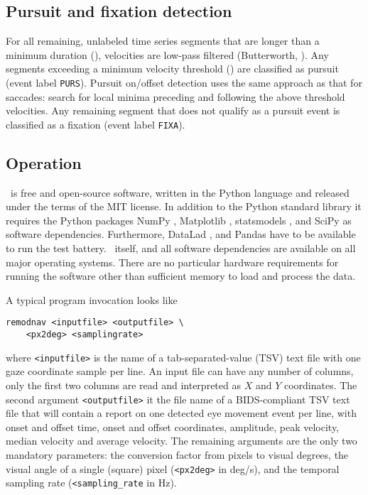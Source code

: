 \subsection*{Pursuit and fixation detection}

For all remaining, unlabeled time series segments that are longer than a
minimum duration (), velocities are low-pass
filtered (Butterworth, ). Any segments
exceeding a minimum velocity threshold () are
classified as pursuit (event label \texttt{PURS}). Pursuit on/offset detection
uses the same approach as that for saccades: search for local minima preceding
and following the above threshold velocities.
%
Any remaining segment that does not qualify as a pursuit event is classified
as a fixation (event label \texttt{FIXA}).


\subsection*{Operation}\label{op}

\remodnav\ is free and open-source software, written in the Python language and
released under the terms of the MIT license. In addition to the Python standard
library it requires the Python packages
%
NumPy \citep{oliphant2006guide},
Matplotlib \citep{hunter2007matplotlib},
statsmodels \citep{seabold2010statsmodels},
and SciPy \citep{JOP+2001} as software dependencies.
Furthermore, DataLad \citep{HH+2013},
and Pandas \citep{mckinney2010data}
%
have to be available to run the test
battery. \remodnav\ itself, and all software dependencies are available on all
major operating systems.  There are no particular hardware requirements for
running the software other than sufficient memory to load and process the data.

A typical program invocation looks like
%
\begin{verbatim}
remodnav <inputfile> <outputfile> \
    <px2deg> <samplingrate>
\end{verbatim}
%
where \texttt{<inputfile>} is the name of a tab-separated-value (TSV) text file
with one gaze coordinate sample per line. An input file can have any number of
columns, only the first two columns are read and interpreted as $X$ and $Y$
coordinates. The second argument \texttt{<outputfile>} it the file name of a
BIDS-compliant \citep{gorgolewski2016brain} TSV text file that will contain a
report on one detected eye movement event per line, with onset and offset time,
onset and offset coordinates, amplitude, peak velocity, median velocity and
average velocity. The remaining arguments are the only two mandatory
parameters: the conversion factor from pixels to visual degrees, \ie the visual
angle of a single (square) pixel (\texttt{<px2deg>} in \unit{deg/s}), and the
temporal sampling rate (\texttt{<sampling\_rate} in \unit{Hz}).

